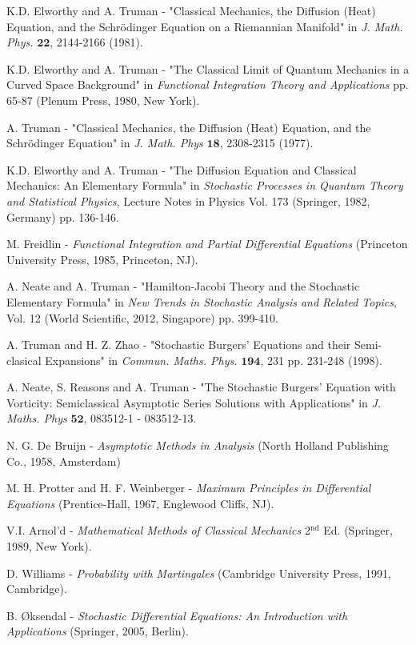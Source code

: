 \documentclass[a4paper,12pt,draft]{report}
\theoremstyle{remark}
\theoremstyle{definition}
\begin{document}
\begin{thebibliography}{99}

 K.D. Elworthy and A. Truman - "Classical Mechanics, the Diffusion (Heat) Equation, and the Schr\"{o}dinger Equation on a Riemannian Manifold" in \emph{J. Math. Phys.} $\mathbf{22}$, 2144-2166 (1981).

 K.D. Elworthy and A. Truman - "The Classical Limit of Quantum Mechanics in a Curved Space Background" in \emph{Functional Integration Theory and Applications} pp. 65-87 (Plenum Press, 1980, New York).

 A. Truman - "Classical Mechanics, the Diffusion (Heat) Equation, and the Schr\"{o}dinger Equation" in \emph{J. Math. Phys} $\mathbf{18}$, 2308-2315 (1977).

 K.D. Elworthy and A. Truman - "The Diffusion Equation and Classical Mechanics: An Elementary Formula" in \emph{Stochastic Processes in Quantum Theory and Statistical Physics}, Lecture Notes in Physics Vol. 173 (Springer, 1982, Germany) pp. 136-146.

 M. Freidlin - \emph{Functional Integration and Partial Differential Equations} (Princeton University Press, 1985, Princeton, NJ).

 A. Neate and A. Truman - "Hamilton-Jacobi Theory and the Stochastic Elementary Formula" in \emph{New Trends in Stochastic Analysis and Related Topics}, Vol. 12 (World Scientific, 2012, Singapore) pp. 399-410.

 A. Truman and H. Z. Zhao - "Stochastic Burgers' Equations and their Semi-clasical Expansions" in \emph{Commun. Maths. Phys.} $\mathbf{194}$, 231 pp. 231-248 (1998).

 A. Neate, S. Reasons and A. Truman - "The Stochastic Burgers' Equation with Vorticity: Semiclassical Asymptotic Series Solutions with Applications" in \emph{J. Maths. Phys} $\mathbf{52}$, 083512-1 - 083512-13.

 N. G. De Bruijn - \emph{Asymptotic Methods in Analysis} (North Holland Publishing Co., 1958, Amsterdam)

 M. H. Protter and H. F. Weinberger - \emph{Maximum Principles in Differential Equations} (Prentice-Hall, 1967, Englewood Cliffs, NJ).

 V.I. Arnol'd - \emph{Mathematical Methods of Classical Mechanics} 2$^{\text{nd}}$ Ed. (Springer, 1989, New York).

 D. Williams - \emph{Probability with Martingales} (Cambridge University Press, 1991, Cambridge).

 B. \O ksendal - \emph{Stochastic Differential Equations: An Introduction with Applications} (Springer, 2005, Berlin).

\end{thebibliography}
\end{document}
